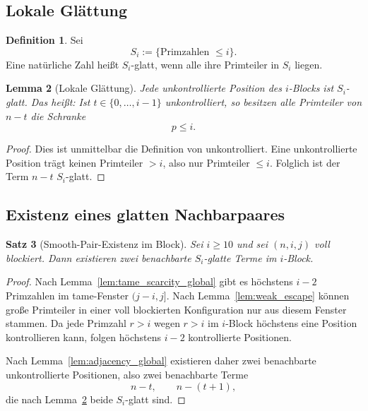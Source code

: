 \documentclass[12pt,a4paper]{article}
\theoremstyle{plain}
\newtheorem{theorem}{Satz}[section]
\newtheorem{lemma}[theorem]{Lemma}
\theoremstyle{definition}
\newtheorem{definition}[theorem]{Definition}
\theoremstyle{remark}
\begin{document}
	\subsection{Lokale Glättung}
	
	\begin{definition}
		Sei
		\[
		S_i:=\{\text{Primzahlen } \le i\}.
		\]
		Eine natürliche Zahl heißt \(S_i\)-glatt, wenn alle ihre Primteiler in \(S_i\) liegen.
	\end{definition}
	
	\begin{lemma}[Lokale Glättung]
		\label{lem:local_smoothing_global}
		Jede unkontrollierte Position des \(i\)-Blocks ist \(S_i\)-glatt. Das heißt: Ist
		\(t\in\{0,\dots,i-1\}\) unkontrolliert, so besitzen alle Primteiler von \(n-t\) die Schranke
		\[
		p\le i.
		\]
	\end{lemma}
	
	\begin{proof}
		Dies ist unmittelbar die Definition von unkontrolliert. Eine unkontrollierte Position
		trägt keinen Primteiler \(>i\), also nur Primteiler \(\le i\). Folglich ist der Term
		\(n-t\) \(S_i\)-glatt.
	\end{proof}
	
	\subsection{Existenz eines glatten Nachbarpaares}
	
	\begin{theorem}[Smooth-Pair-Existenz im Block]
		\label{thm:smooth_pair_block}
		Sei \(i\ge10\) und sei \((n,i,j)\) voll blockiert. Dann existieren zwei benachbarte
		\(S_i\)-glatte Terme im \(i\)-Block.
	\end{theorem}
	
	\begin{proof}
		Nach Lemma~\ref{lem:tame_scarcity_global} gibt es höchstens \(i-2\) Primzahlen im tame-Fenster
		\((j-i,j]\). Nach Lemma~\ref{lem:weak_escape} können große Primteiler in einer voll
		blockierten Konfiguration nur aus diesem Fenster stammen. Da jede Primzahl \(r>i\) wegen
		\(r>i\) im \(i\)-Block höchstens eine Position kontrollieren kann, folgen höchstens \(i-2\)
		kontrollierte Positionen.
		
		Nach Lemma~\ref{lem:adjacency_global} existieren daher zwei benachbarte unkontrollierte
		Positionen, also zwei benachbarte Terme
		\[
		n-t,\qquad n-(t+1),
		\]
		die nach Lemma~\ref{lem:local_smoothing_global} beide \(S_i\)-glatt sind.
	\end{proof}
	
\end{document}
